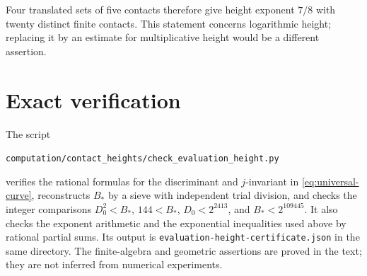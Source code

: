 \documentclass[11pt,a4paper]{article}
\theoremstyle{definition}
\begin{document}
Four translated sets of five contacts therefore give height exponent
$7/8$ with twenty distinct finite contacts. This statement concerns
logarithmic height; replacing it by an estimate for multiplicative
height would be a different assertion.

\section{Exact verification}\label{sec:verification}

The script
\begin{center}\small
\nolinkurl{computation/contact_heights/check_evaluation_height.py}
\end{center}
verifies the rational formulas for the discriminant and $j$-invariant
in \eqref{eq:universal-curve}, reconstructs $B_*$ by a sieve with
independent trial division, and checks the integer comparisons
$D_0^2<B_*$, $144<B_*$, $D_0<2^{2413}$, and $B_*<2^{109445}$.
It also checks the exponent arithmetic and the exponential
inequalities used above by rational partial sums.
Its output is
\nolinkurl{evaluation-height-certificate.json} in the same directory.
The finite-algebra and geometric assertions are proved in the text;
they are not inferred from numerical experiments.
\end{document}
